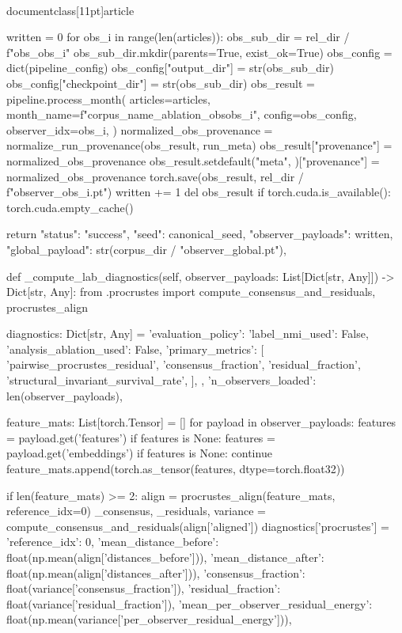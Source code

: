 \\documentclass[11pt]{article}
\begin{document}
\begin{CodeBlock}
        written = 0
        for obs_i in range(len(articles)):
            obs_sub_dir = rel_dir / f"obs_{obs_i}"
            obs_sub_dir.mkdir(parents=True, exist_ok=True)
            obs_config = dict(pipeline_config)
            obs_config["output_dir"] = str(obs_sub_dir)
            obs_config["checkpoint_dir"] = str(obs_sub_dir)
            obs_result = pipeline.process_month(
                articles=articles,
                month_name=f"{corpus_name}_ablation_obs{obs_i}",
                config=obs_config,
                observer_idx=obs_i,
            )
            normalized_obs_provenance = normalize_run_provenance(obs_result, run_meta)
            obs_result["provenance"] = normalized_obs_provenance
            obs_result.setdefault("meta", {})["provenance"] = normalized_obs_provenance
            torch.save(obs_result, rel_dir / f"observer_{obs_i}.pt")
            written += 1
            del obs_result
            if torch.cuda.is_available():
                torch.cuda.empty_cache()

        return {
            "status": "success",
            "seed": canonical_seed,
            "observer_payloads": written,
            "global_payload": str(corpus_dir / "observer_global.pt"),
        }

    def _compute_lab_diagnostics(self, observer_payloads: List[Dict[str, Any]]) -> Dict[str, Any]:
        from .procrustes import compute_consensus_and_residuals, procrustes_align

        diagnostics: Dict[str, Any] = {
            'evaluation_policy': {
                'label_nmi_used': False,
                'analysis_ablation_used': False,
                'primary_metrics': [
                    'pairwise_procrustes_residual',
                    'consensus_fraction',
                    'residual_fraction',
                    'structural_invariant_survival_rate',
                ],
            },
            'n_observers_loaded': len(observer_payloads),
        }

        feature_mats: List[torch.Tensor] = []
        for payload in observer_payloads:
            features = payload.get('features')
            if features is None:
                features = payload.get('embeddings')
            if features is None:
                continue
            feature_mats.append(torch.as_tensor(features, dtype=torch.float32))

        if len(feature_mats) >= 2:
            align = procrustes_align(feature_mats, reference_idx=0)
            _consensus, _residuals, variance = compute_consensus_and_residuals(align['aligned'])
            diagnostics['procrustes'] = {
                'reference_idx': 0,
                'mean_distance_before': float(np.mean(align['distances_before'])),
                'mean_distance_after': float(np.mean(align['distances_after'])),
                'consensus_fraction': float(variance['consensus_fraction']),
                'residual_fraction': float(variance['residual_fraction']),
                'mean_per_observer_residual_energy': float(np.mean(variance['per_observer_residual_energy'])),
            }


\end{CodeBlock}
\end{document}
